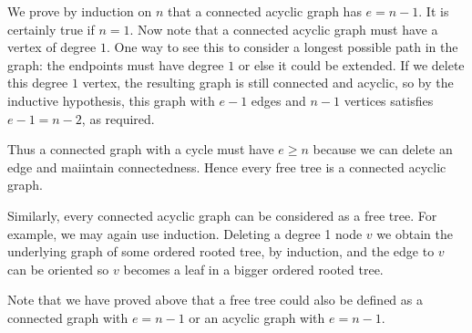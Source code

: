 We prove by induction on $n$ that a connected acyclic graph has
$e=n-1$. It is certainly true if $n=1$. Now note that a connected acyclic
graph must have a vertex of degree $1$. One way to see this to consider
a longest possible path in the graph: the endpoints must have degree
$1$ or else it could be extended. If we delete this degree $1$ vertex,
the resulting graph is still connected and acyclic, so by the inductive
hypothesis, this graph with $e-1$ edges and $n-1$ vertices satisfies
$e-1=n-2$, as required.

Thus a connected graph with a cycle must have $e\geq n$ because we can
delete an edge and maiintain connectedness. Hence every free tree is a
connected acyclic graph.

Similarly, every connected acyclic graph can be considered as a free
tree. For example, we may again use induction. Deleting a degree 1
node $v$ we obtain the underlying graph of some ordered rooted tree,
by induction, and the edge to $v$ can be oriented so $v$ becomes a leaf
in a bigger ordered rooted tree.

Note that we have proved above that a free tree could also be defined
as a connected graph with $e=n-1$ or an acyclic graph with $e=n-1$.
\fi

